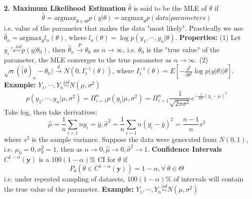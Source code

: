 \documentclass[12pt]{article}
\begin{document}
\newline
\textbf{2. Maximum Likelihood Estimation} \newline \newline
$\hat{\theta}$ is said to be the MLE of $\theta$ if
\[
	\hat{\theta} = \text{argmax}_{\theta \in \Theta} p(y | \theta) = \text{argmax}_\theta p(data | parameters)
\]
i.e. value of the parameter that makes the data "most likely". \newline
Practically we use $\hat{\theta}_n = \text{argmax}_\theta l_n(\theta)$, where $l_n(\theta) = \log p(y_1, \cdots, y_n | \theta)$. \newline
\textbf{Properties:} \newline
(1) Let $y_i \,'s \stackrel{iid}{\sim} p(y | \theta_0)$, then $\hat{\theta}_n \stackrel{P}{\rightarrow} \theta_0 \text{ as } n \rightarrow \infty$, i.e. $\theta_0$ is the "true value" of the parameter, the MLE converges to the true parameter as $n \rightarrow \infty$. \newline
(2) $\sqrt{n}(\hat(\theta)_n - \theta_0) \stackrel{d}{\rightarrow} N(0, I_1^{-1}(\theta))$, where $I_1^{-1}(\theta) = E[-\frac{\partial^2}{\partial \theta^2} \log p(y|\theta)|\theta]$. \newline
\textbf{Example:} \newline
$Y_1, \cdots, Y_n \stackrel{iid}{\sim} N(\mu, \sigma^2)$
\[
	p(y_1, \cdots, y_n | \mu, \sigma^2) = \Pi_{i=1}^n p(y_i | \mu, \sigma^2) = \Pi_{i=1}^n \frac{1}{\sqrt{2\pi\sigma^2}} e^{-\frac{1}{2\sigma^2}(y_i - \mu)^2}
\]
Take log, then take derivatives:
\[
	\hat{\mu} = \frac{1}{n} \sum_{i = 1}{n} y_i = \bar{y}, \hat{\sigma}^2 = \frac{1}{n}\sum_{i=1}{n}(y_i - \bar{y})^2 = \frac{n-1}{n} s^2
\]
where $s^2$ is the sample variance. \newline
Suppose the data were generated from $N(0, 1)$, i.e. $\mu_0 = 0, \sigma^2_0 = 1$, then as $n \rightarrow 0, \hat{\mu} \rightarrow 0, \hat{\sigma}^2 \rightarrow 1$. \newline \newline
\textbf{Confidence Intervals} \newline
$C^{1 - \alpha}(\mathbf{y})$ is a $100(1-\alpha)\%$ CI for $\theta$ if
\[
	P_\theta(\theta \in C^{1 - \alpha}(\mathbf{y})) = 1 - \alpha, \forall \ \theta \in \Theta
\]
i.e. under repeated sampling of datasets, $100(1-\alpha)\%$ of intervals will contain the true value of the parameter.\newline
\textbf{Example:} $Y_1, \cdots, Y_n \stackrel{iid}{\sim}N(\mu, \sigma^2)$ \newline
\end{document}
